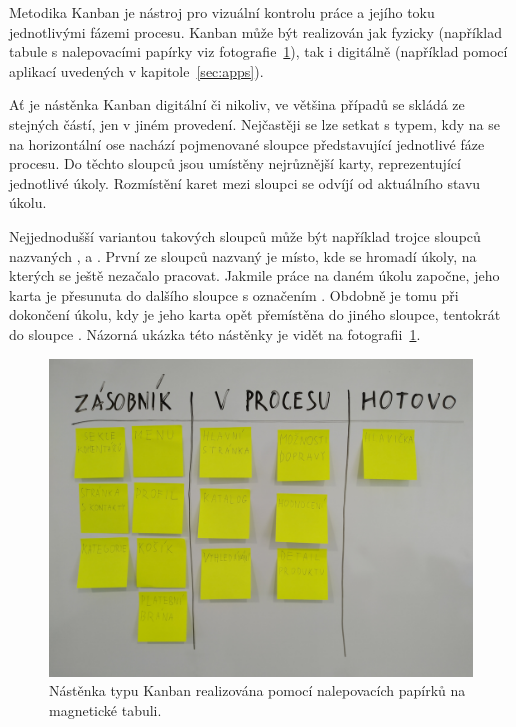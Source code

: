 Metodika Kanban je nástroj pro vizuální kontrolu práce a jejího toku jednotlivými fázemi procesu. Kanban může být realizován jak fyzicky (například tabule s nalepovacími papírky viz fotografie~\ref{img:kanban-whiteboard}), tak i digitálně (například pomocí aplikací uvedených v kapitole~\ref{sec:apps}). 

Ať je nástěnka Kanban digitální či nikoliv, ve většina případů se skládá ze stejných částí, jen v jiném provedení. Nejčastěji se lze setkat s typem, kdy na se na horizontální ose nachází pojmenované sloupce představující jednotlivé fáze procesu. Do těchto sloupců jsou umístěny nejrůznější karty, reprezentující jednotlivé úkoly. Rozmístění karet mezi sloupci se odvíjí od aktuálního stavu úkolu.

Nejjednodušší variantou takových sloupců může být například trojce sloupců nazvaných ,  a . První ze sloupců nazvaný  je místo, kde se hromadí úkoly, na kterých se ještě nezačalo pracovat. Jakmile práce na daném úkolu započne, jeho karta je přesunuta do dalšího sloupce s označením . Obdobně je tomu při dokončení úkolu, kdy je jeho karta opět přemístěna do jiného sloupce, tentokrát do sloupce . Názorná ukázka této nástěnky je vidět na fotografii~\ref{img:kanban-whiteboard}.

\begin{figure}[H]
	\centering
	\includegraphics[width=\textwidth]{obrazky-figures/kanban-sticky-note}
	\caption{Nástěnka typu Kanban realizována pomocí nalepovacích papírků na magnetické tabuli.}
	\label{img:kanban-whiteboard}
\end{figure}

